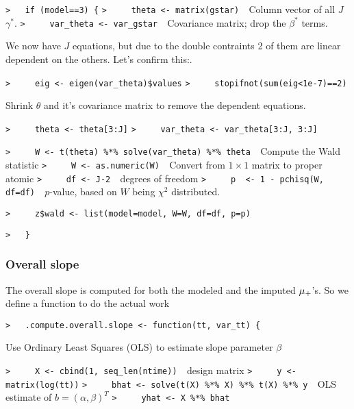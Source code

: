 \documentclass[a4paper]{article}
\begin{document}
\verb~>   if (model==3) {~\newline
\verb~>     theta <- matrix(gstar)  ~{\sffamily Column vector of all $J$ $\gamma^\ast$.}\newline
\verb~>     var_theta <- var_gstar  ~{\sffamily Covariance matrix; drop the $\beta^\ast$ terms.}\par

We now have $J$ equations, but due to the double contraints 2 of them are linear
dependent on the others. Let's confirm this:.\par
\verb~>     eig <- eigen(var_theta)$values~\newline
\verb~>     stopifnot(sum(eig<1e-7)==2)~\par

Shrink $\theta$ and it's covariance matrix to remove the dependent equations.\par
\verb~>     theta <- theta[3:J]~\newline
\verb~>     var_theta <- var_theta[3:J, 3:J]~\par

\verb~>     W <- t(theta) %*% solve(var_theta) %*% theta  ~{\sffamily Compute the Wald statistic}\newline
\verb~>     W <- as.numeric(W)  ~{\sffamily Convert from $1\times1$ matrix to proper atomic}\newline
\verb~>     df <- J-2  ~{\sffamily degrees of freedom}\newline
\verb~>     p  <- 1 - pchisq(W, df=df)  ~{\sffamily $p$-value, based on $W$ being $\chi^2$ distributed.}\par

\verb~>     z$wald <- list(model=model, W=W, df=df, p=p)~\par

\verb~>   }~\par


\subsubsection{Overall slope}\par

The overall slope is computed for both the modeled and the imputed ${\mu_{+}}$'s.
So we define a function to do the actual work\par
\verb~>   .compute.overall.slope <- function(tt, var_tt) {~\par
Use Ordinary Least Squares (OLS) to estimate slope parameter $\beta$\par
\verb~>     X <- cbind(1, seq_len(ntime))  ~{\sffamily design matrix}\newline
\verb~>     y <- matrix(log(tt))~\newline
\verb~>     bhat <- solve(t(X) %*% X) %*% t(X) %*% y  ~{\sffamily OLS estimate of $b = (\alpha,\beta)^T$}\newline
\verb~>     yhat <- X %*% bhat~\par
\end{document}
